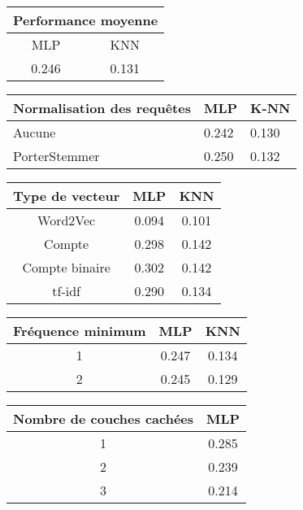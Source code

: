 \begin{center}
\begin{tabular}{|c|c|}
\hline
\multicolumn{2}{|c|}{\textbf{Performance moyenne}} \\ \hline
MLP & KNN \\ \hline
0.246 & 0.131 \\ \hline
\end{tabular}
\end{center}


\begin{center}
\begin{tabular}{|l|l|l|}
\hline
\textbf{Normalisation des requêtes} & MLP & K-NN \\ \hline
Aucune                     & 0.242                  & 0.130                  \\ \hline
PorterStemmer              & 0.250                  & 0.132                  \\ \hline
\end{tabular}
\end{center}

\begin{center}
\begin{tabular}{|c|c|c|}
\hline
\textbf{Type de vecteur} & MLP & KNN \\ \hline
Word2Vec & 0.094 & 0.101 \\ \hline
Compte & 0.298 & 0.142 \\ \hline
Compte binaire & 0.302 & 0.142 \\ \hline
tf-idf & 0.290 & 0.134 \\ \hline
\end{tabular}
\end{center}

\begin{center}
\begin{tabular}{|c|c|c|}
\hline
\textbf{Fréquence minimum} & MLP & KNN \\ \hline
1 & 0.247 & 0.134 \\ \hline
2 & 0.245 & 0.129 \\ \hline
\end{tabular}
\end{center}

\begin{center}
\begin{tabular}{|c|c|}
\hline
\textbf{Nombre de couches cachées} & MLP \\ \hline
1 & 0.285 \\ \hline
2 & 0.239 \\ \hline
3 & 0.214 \\ \hline
\end{tabular}
\end{center}


